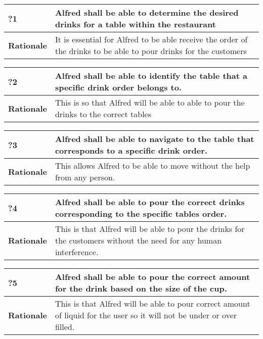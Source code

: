 \documentclass [11pt]{article}
\begin{document}
\begin{longtable}{| p{ } | p{ } | }\hline 
\rowcolor{tableCell}\textbf{?1} & Alfred shall be able to determine the desired drinks for a table within the restaurant \\ \hline
\textbf{Rationale} & It is essential for Alfred to be able receive the order of the drinks to be able to pour drinks for the customers\\ \hline 
\end{longtable}

\begin{longtable}{| p{ } | p{ } | }\hline 
\rowcolor{tableCell}\textbf{?2} & Alfred shall be able to identify the table that a specific drink order belongs to.\\ \hline
\textbf{Rationale} &  This is so that Alfred will be able to able to pour the drinks to the correct tables\\ \hline 

\end{longtable}

\begin{longtable}{| p{ } | p{ } | }\hline 
\rowcolor{tableCell}\textbf{?3} &  Alfred shall be able to navigate to the table that corresponds to a specific drink order. \\ \hline
\textbf{Rationale} & This allows Alfred to be able to move without the help from any person. \\ \hline 
\end{longtable}

\begin{longtable}{| p{ } | p{ } | }\hline 
\rowcolor{tableCell}\textbf{?4} & Alfred shall be able to pour the correct drinks corresponding to the specific tables order.\\ \hline
\textbf{Rationale} &  This is that Alfred will be able to pour the drinks for the customers without the need for any human interference. \\ \hline 
\end{longtable}

\begin{longtable}{| p{ } | p{ } | }\hline 
	\rowcolor{tableCell}\textbf{?5} & Alfred shall be able to pour the correct amount for the drink based on the size of the cup.\\ \hline
	\textbf{Rationale} &  This is that Alfred will be able to pour correct amount of liquid for the user so it will not be under or over filled. \\ \hline 
\end{longtable}
\end{document}
